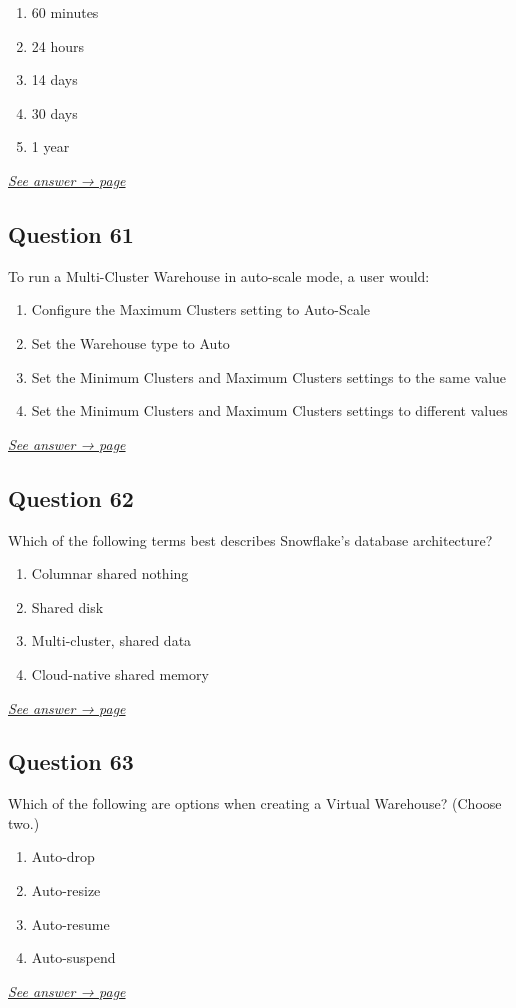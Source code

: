 \documentclass[12pt]{article}
\newcommand{\seeanswer}[1]{%
  \par\smallskip\emph{\hyperref[ans:#1]{See answer → page \pageref{ans:#1}}}%
}
\begin{document}
\begin{enumerate}[label=\Alph*.]
  \item 60 minutes
  \item 24 hours
  \item 14 days
  \item 30 days
  \item 1 year
\end{enumerate}
\seeanswer{60}

\subsection*{Question 61}\label{q:61}
To run a Multi-Cluster Warehouse in auto-scale mode, a user would:

\begin{enumerate}[label=\Alph*.]
  \item Configure the Maximum Clusters setting to Auto-Scale
  \item Set the Warehouse type to Auto
  \item Set the Minimum Clusters and Maximum Clusters settings to the same value
  \item Set the Minimum Clusters and Maximum Clusters settings to different values
\end{enumerate}
\seeanswer{61}

\subsection*{Question 62}\label{q:62}
Which of the following terms best describes Snowflake's database architecture?

\begin{enumerate}[label=\Alph*.]
  \item Columnar shared nothing
  \item Shared disk
  \item Multi-cluster, shared data
  \item Cloud-native shared memory
\end{enumerate}
\seeanswer{62}

\subsection*{Question 63}\label{q:63}
Which of the following are options when creating a Virtual Warehouse? (Choose two.)

\begin{enumerate}[label=\Alph*.]
  \item Auto-drop
  \item Auto-resize
  \item Auto-resume
  \item Auto-suspend
\end{enumerate}
\seeanswer{63}
\end{document}
